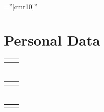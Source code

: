 \documentclass[a4paper,10pt]{article}
\begin{document}
\pagestyle{empty}
\font\fb=''[cmr10]''
\par{\centering
		{\Huge 
	}\bigskip\par}
\section{Personal Data}
\begin{tabular}{rl}
\textsc{}&\\
\end{tabular}
\section{}
\begin{tabular}{rl}
\textsc{}&\\
\end{tabular}
\section{}
\begin{tabular}{rl}
\textsc{}&\\
\end{tabular}
\section{}
\begin{tabular}{rl}
\end{tabular}
\section{}
\begin{tabular}{rl}
\end{tabular}
\end{document}
